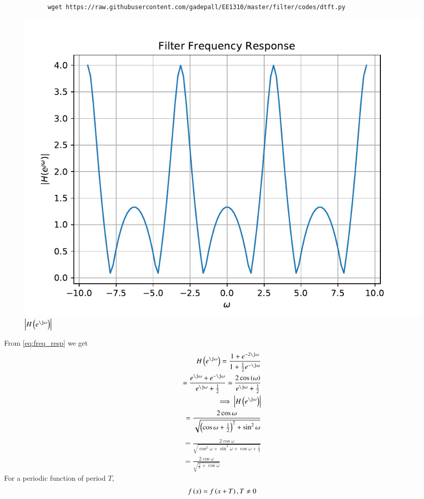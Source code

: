 \documentclass[journal,12pt,twocolumn]{IEEEtran}
\renewcommand\thesection{\arabic{section}}
\begin{document}
\begin{enumerate}[label=\thesection.\arabic*]
		\begin{lstlisting}
			wget https://raw.githubusercontent.com/gadepall/EE1310/master/filter/codes/dtft.py
		\end{lstlisting}
		\begin{figure}[!ht]
			\centering
			\includegraphics[width=\columnwidth]{./figs/dtft}
			\caption{$\abs{H\brak{e^{\j\omega}}}$}
			\label{fig:dtft}
		\end{figure}
			\solution From \eqref{eq:freq_resp} we get
			\begin{align}
				H\brak{e^{\j \omega}}=\frac{1 + e^{-2\j \omega}}{1 + \frac{1}{2}e^{-\j \omega}}\\
				=\frac{e^{\j \omega} + e^{-\j \omega}}{e^{\j \omega} + \frac{1}{2}}
				=\frac{2\cos\brak{\omega}}{e^{\j \omega} + \frac{1}{2}}\\
				\implies \abs{H\brak{e^{\j \omega}}}\\
				=\frac{2\cos\omega}{\sqrt{\brak{\cos\omega+\frac{1}{2}}^{2}+\sin^2\omega}}
			\end{align}
			\begin{align}
				=\frac{2\cos\omega}{\sqrt{\cos^2\omega + \sin^2 \omega + \cos \omega + \frac{1}{4}}}\\
				=\frac{2\cos\omega}{\sqrt{\frac{5}{4}+\cos\omega}}
			\end{align}
			For a periodic function of period $T$,
			\begin{align}
				f\left(x\right) = f\left(x+T\right), T \neq 0	 
			\end{align}
			

\end{enumerate}
\end{document}

